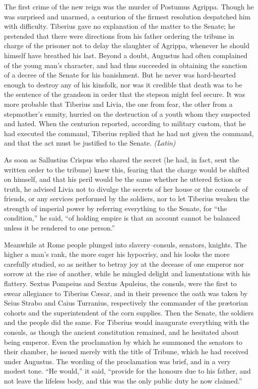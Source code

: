 
The first crime of the new reign was the murder of Postumus Agrippa. Though he was surprised and unarmed, a centurion of the firmest resolution despatched him with difficulty. Tiberius gave no explanation of the matter to the Senate; he pretended that there were directions from his father ordering the tribune in charge of the prisoner not to delay the slaughter of Agrippa, whenever he should himself have breathed his last. Beyond a doubt, Augustus had often complained of the young man's character, and had thus succeeded in obtaining the sanction of a decree of the Senate for his banishment. But he never was hard-hearted enough to destroy any of his kinsfolk, nor was it credible that death was to be the sentence of the grandson in order that the stepson might feel secure. It was more probable that Tiberius and Livia, the one from fear, the other from a stepmother's enmity, hurried on the destruction of a youth whom they suspected and hated. When the centurion reported, according to military custom, that he had executed the command, Tiberius replied that he had not given the command, and that the act must be justified to the Senate. \emph{(Latin)}

As soon as Sallustius Crispus who shared the secret (he had, in fact, sent the written order to the tribune) knew this, fearing that the charge would be shifted on himself, and that his peril would be the same whether he uttered fiction or truth, he advised Livia not to divulge the secrets of her house or the counsels of friends, or any services performed by the soldiers, nor to let Tiberius weaken the strength of imperial power by referring everything to the Senate, for ``the condition,'' he said, ``of holding empire is that an account cannot be balanced unless it be rendered to one person.''


Meanwhile at Rome people plunged into slavery--consuls, senators, knights. The higher a man's rank, the more eager his hypocrisy, and his looks the more carefully studied, so as neither to betray joy at the decease of one emperor nor sorrow at the rise of another, while he mingled delight and lamentations with his flattery. Sextus Pompeius and Sextus Apuleius, the consuls, were the first to swear allegiance to Tiberius Cæsar, and in their presence the oath was taken by Seius Strabo and Caius Turranius, respectively the commander of the prætorian cohorts and the superintendent of the corn supplies. Then the Senate, the soldiers and the people did the same. For Tiberius would inaugurate everything with the consuls, as though the ancient constitution remained, and he hesitated about being emperor. Even the proclamation by which he summoned the senators to their chamber, he issued merely with the title of Tribune, which he had received under Augustus. The wording of the proclamation was brief, and in a very modest tone. ``He would,'' it said, ``provide for the honours due to his father, and not leave the lifeless body, and this was the only public duty he now claimed.''

